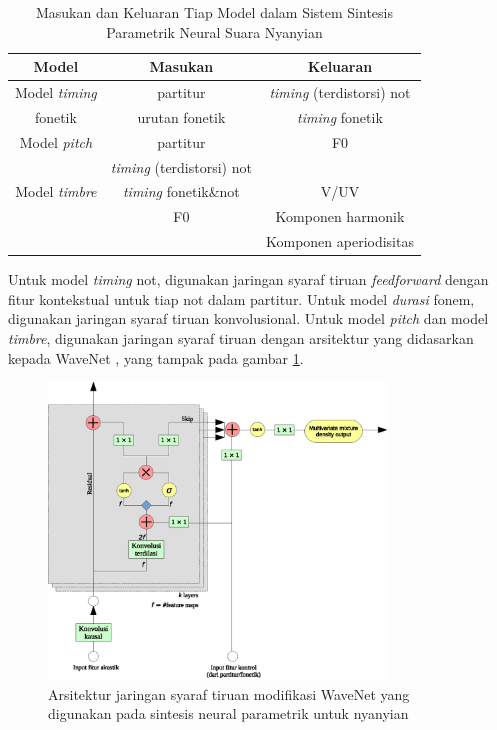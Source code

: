 \begin{table}[h]
	\centering
    \caption{Masukan dan Keluaran Tiap Model dalam Sistem Sintesis Parametrik Neural Suara Nyanyian \parencite{bonada2017singing}}\label{tab-models-in-out-bonada}
	\begin{tabular}{ |c|c|c| } 
	 \hline
	 Model & Masukan & Keluaran \\
	 \hline 
	 Model \textit{timing} & partitur & \textit{timing} (terdistorsi) not \\ 
	 fonetik  & urutan fonetik & \textit{timing} fonetik \\ 
	 \hline
	 Model \textit{pitch} & partitur & F0 \\ 
	  & \textit{timing} (terdistorsi) not  & \\ 
	 \hline
	 Model \textit{timbre} &  \textit{timing} fonetik\&not & V/UV \\ 
	  & F0 & Komponen harmonik\\ 
	  &   & Komponen aperiodisitas\\ 
	 \hline
	\end{tabular}
\end{table}

Untuk model \textit{timing} not, digunakan jaringan syaraf tiruan \textit{feedforward} dengan fitur kontekstual untuk tiap not dalam partitur. Untuk model \textit{durasi} fonem, digunakan jaringan syaraf tiruan konvolusional. \parencite{bonada2017singing} Untuk model \textit{pitch} dan model \textit{timbre}, digunakan jaringan syaraf tiruan dengan arsitektur yang didasarkan kepada WaveNet \parencite{Oord2016WaveNetAG}, yang tampak pada gambar \ref{fig-network-architecture-bonada}. \parencite{bonada2017singing}

\begin{figure}[h]
    \centering
    \includegraphics[width=0.8\textwidth]{resources/network-architecture-bonada.eps}
    \caption{Arsitektur jaringan syaraf tiruan modifikasi WaveNet yang digunakan pada sintesis neural parametrik untuk nyanyian\parencite{bonada2017singing}}\label{fig-network-architecture-bonada}
\end{figure}


